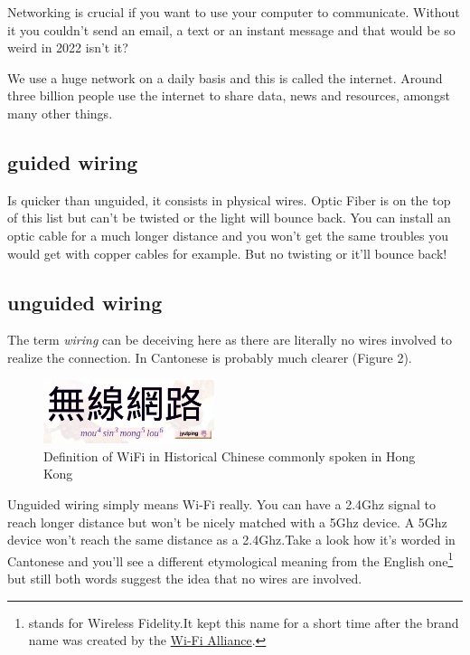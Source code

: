 \documentclass[a4paper,12pt]{article}
\begin{document}


\newline \noindent Networking is crucial if you want to use your computer to communicate. Without it you couldn’t send an email, a text or an instant message and that would be so weird in 2022 isn't it?

\noindent We use a huge network on a daily basis and this is called the internet. Around three billion people use the internet to share data, news and resources, amongst many other things.
\clearpage
\subsection{guided wiring}
Is quicker than unguided, it consists in physical wires. Optic Fiber is on the top of this list but can't be twisted or the light will bounce back. You can install an optic cable for a much longer distance and you won't get the same troubles you would get with copper cables for example. But no twisting or it'll bounce back!

\subsection{unguided wiring}
The term \emph{wiring} can be deceiving here as there are literally no wires involved to realize the connection. In Cantonese is probably much clearer (Figure 2).


\begin{figure}
\centering
\includegraphics[width=5cm]{WiFi-HK.PNG}
\caption{Definition of WiFi in Historical Chinese commonly spoken in Hong Kong}\label{wrap-fig:5}
\end{figure}


Unguided wiring simply means Wi-Fi really. You can have a 2.4Ghz signal to reach longer distance but won't be nicely matched with a 5Ghz device. A 5Ghz device won't reach the same distance as a 2.4Ghz.Take a look how it's worded in Cantonese and you'll see a different etymological meaning from the English one\footnote{\label{wifialliance}stands for Wireless Fidelity.It kept this name for a short time after the brand name was created by the \href{https://en.wikipedia.org/wiki/Wi-Fi_Alliance}{Wi-Fi Alliance}.} but still both words suggest the idea that no wires are involved.
\end{document}
